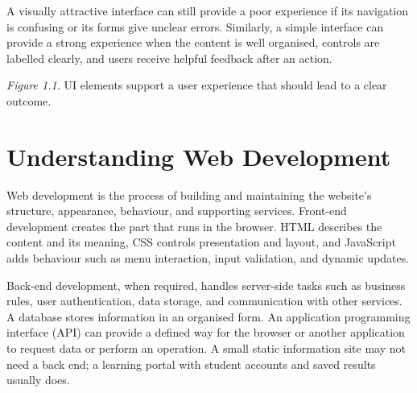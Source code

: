 \documentclass[11pt,openany,oneside]{book}
\begin{document}
A visually attractive interface can still provide a poor experience if its navigation is confusing or its forms give unclear errors. Similarly, a simple interface can provide a strong experience when the content is well organised, controls are labelled clearly, and users receive helpful feedback after an action.

\begin{center}
\end{center}
\textit{Figure 1.1.} UI elements support a user experience that should lead to a clear outcome.

\section{Understanding Web Development}
Web development is the process of building and maintaining the website's structure, appearance, behaviour, and supporting services. Front-end development creates the part that runs in the browser. HTML describes the content and its meaning, CSS controls presentation and layout, and JavaScript adds behaviour such as menu interaction, input validation, and dynamic updates.

Back-end development, when required, handles server-side tasks such as business rules, user authentication, data storage, and communication with other services. A database stores information in an organised form. An application programming interface (API) can provide a defined way for the browser or another application to request data or perform an operation. A small static information site may not need a back end; a learning portal with student accounts and saved results usually does.
\end{document}
